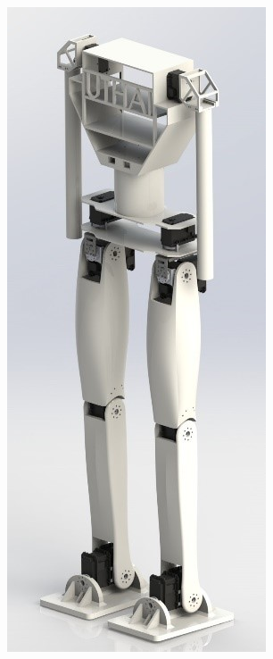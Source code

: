 \begin{figure}[!ht]
  \centering
  \begin{subfigure}[b]{0.2\linewidth}
    \includegraphics[width=\linewidth]{chapter4/images/UTHAI_ver_1.jpg}

\end{subfigure}
\end{figure}
